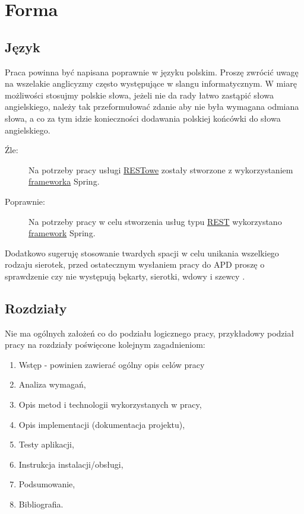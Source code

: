 \documentclass[12pt,a4paper]{article}
\begin{document}
\section{Forma}

\subsection{Język}
Praca powinna być napisana poprawnie w języku polskim. Proszę zwrócić uwagę na wszelakie anglicyzmy często występujące w slangu informatycznym. W miarę możliwości stosujmy polskie słowa, jeżeli nie da rady łatwo zastąpić słowa angielskiego, należy tak przeformułować zdanie aby nie była wymagana odmiana słowa, a co za tym idzie konieczności dodawania polskiej końcówki do słowa angielskiego.
\begin{description}
  \item[{\color{red}Źle:}] Na potrzeby pracy usługi \underline{RESTowe} zostały stworzone z wykorzystaniem \underline{frameworka} Spring.
  \item[Poprawnie:] Na potrzeby pracy w celu stworzenia usług typu \underline{REST} wykorzystano \underline{framework} Spring.
\end{description}

Dodatkowo sugeruję stosowanie twardych spacji w celu unikania wszelkiego rodzaju sierotek, przed ostatecznym wysłaniem pracy do APD proszę o sprawdzenie czy nie występują  bękarty, sierotki, wdowy i szewcy \cite{Bekart}.

\subsection{Rozdziały}
Nie ma ogólnych założeń co do podziału logicznego pracy, przykładowy podział pracy na rozdziały poświęcone kolejnym zagadnieniom:
\begin{enumerate}
\item Wstęp - powinien zawierać ogólny opis celów pracy
\item Analiza wymagań,
\item Opis metod i technologii wykorzystanych w pracy,
\item Opis implementacji (dokumentacja projektu),
\item Testy aplikacji,
\item Instrukcja instalacji/obsługi,
\item Podsumowanie,
\item Bibliografia.
\end{enumerate}
\end{document}
